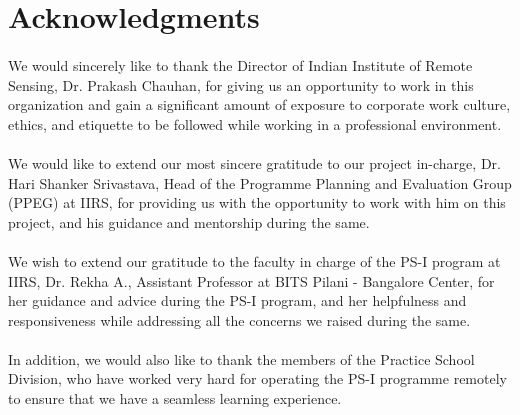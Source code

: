 \documentclass[12pt, a4paper]{report}
\begin{document}
\pagebreak

\setcounter{secnumdepth}{0}
\section{Acknowledgments}
\pagestyle{plain}
\setcounter{page}{3}
\paragraph{}
We would sincerely like to thank the Director of Indian Institute of Remote Sensing, Dr. Prakash Chauhan, for giving us an opportunity to work in this organization and gain a significant amount of exposure to corporate work culture, ethics, and etiquette to be followed while working in a professional environment.
\paragraph{}
We would like to extend our most sincere gratitude to our project in-charge, Dr. Hari Shanker Srivastava, Head of the Programme Planning and Evaluation Group (PPEG) at IIRS, for providing us with the opportunity to work with him on this project, and his guidance and mentorship during the same.
\paragraph{}
We wish to extend our gratitude to the faculty in charge of the PS-I program at IIRS, Dr. Rekha A., Assistant Professor at BITS Pilani - Bangalore Center, for her guidance and advice during the PS-I program, and her helpfulness and responsiveness while addressing all the concerns we raised during the same.
\paragraph{}
In addition, we would also like to thank the members of the Practice School Division, who have worked very hard for operating the PS-I programme remotely to ensure that we have a seamless learning experience.
\pagebreak
\end{document}

